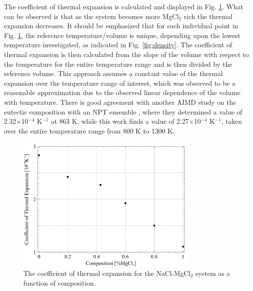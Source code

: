 \documentclass[review]{elsarticle}
\begin{document}
The coefficient of thermal expansion is calculated and displayed in Fig. \ref{fig:CTE}. What can be observed is that as the system becomes more MgCl$_2$ rich the thermal expansion decreases. It should be emphasized that for each individual point in Fig. \ref{fig:CTE}, the reference temperature/volume is unique, depending upon the lowest temperature investigated, as indicated in Fig. \ref{fig:density}. The coefficient of thermal expansion is then calculated from the slope of the volume with respect to the temperature for the entire temperature range and is then divided by the reference volume. This approach assumes a constant value of the thermal expansion over the temperature range of interest, which was observed to be a reasonable approximation due to the observed linear dependence of the volume with temperature. There is good agreement with another AIMD study on the eutectic composition with an NPT ensemble \cite{XU2020568}, where they determined a value of 2.32$\times$10$^{-4}$ K$^{-1}$ at 863 K, while this work finds a value of 2.27$\times$10$^{-4}$ K$^{-1}$, taken over the entire temperature range from 800 K to 1300 K. 

\begin{figure}[h]
 \centering
 \includegraphics[width=0.8\textwidth]{CTE.jpg} 
 \caption{The coefficient of thermal expansion for the NaCl-MgCl$_{2}$ system as a function of composition.}
 \label{fig:CTE}
\end{figure} 
\FloatBarrier
\end{document}
